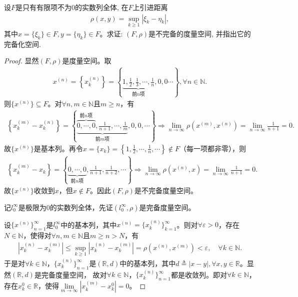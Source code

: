 \documentclass[../../main.tex]{subfiles}%
\begin{document}
\begin{example}
设$F$是只有有限项不为$0$的实数列全体, 在$F$上引进距离
\begin{align*}
\rho(x,y)=\sup\limits_{k\geqslant1}|\xi_k-\eta_k|,
\end{align*}
其中$x=\{\xi_k\}\in F, y=\{\eta_k\}\in F$。求证: $(F,\rho)$是不完备的度量空间, 并指出它的完备化空间.
\end{example}
\begin{proof}
显然$(F,\rho)$是度量空间。取
\begin{align*}
x^{(n)}=\left\{x_k^{(n)}\right\}=\left\{\underbrace{1,\frac{1}{2},\frac{1}{3},\cdots,\frac{1}{n}}_{\text{前}n\text{项}},0,0\cdots\right\},\forall n\in\mathbb{N}.
\end{align*}
则$\{x^{(n)}\}\subseteq F$。对$\forall n,m\in\mathbb{N}$且$m\geqslant n$，有
\begin{align*}
\left\{x_k^{(m)}-x_k^{(n)}\right\}=\left\{\underbrace{\overbrace{0,\cdots,0}^{\text{前}n\text{项}},\frac{1}{n+1},\cdots,\frac{1}{m}}_{\text{前}m\text{项}},0,0,\cdots\right\}\Longrightarrow\lim\limits_{n\rightarrow\infty}\rho(x^{(m)},x^{(n)})=\lim\limits_{n\rightarrow\infty}\frac{1}{n+1}=0.
\end{align*}
故$\{x^{(n)}\}$是基本列。再令$x=\{x_k\}=\left\{1,\frac{1}{2},\cdots,\frac{1}{n},\cdots\right\}\notin F$（每一项都非零），则
\begin{align*}
\left\{x_k^{(m)}-x_k\right\}=\left\{\underbrace{0,\cdots,0}_{\text{前}n\text{项}},\frac{1}{n+1},\frac{1}{n+2},\cdots\right\}\Longrightarrow\lim\limits_{n\rightarrow\infty}\rho(x^{(n)},x)=\lim\limits_{n\rightarrow\infty}\frac{1}{n+1}=0.
\end{align*}
故$\{x^{(n)}\}$收敛到$x$，但$x\notin F$。因此$(F,\rho)$是不完备度量空间。

记$l_0^\infty$是极限为$0$的实数列全体，先证$(l_0^\infty,\rho)$是完备度量空间。

设$\{x^{(n)}\}_{n=1}^{\infty}$是$l_0^\infty$中的基本列，其中$x^{(n)}=\{x_k^{(n)}\}_{k=1}^{\infty}$。则对$\forall \varepsilon>0$，存在$N\in\mathbb{N}$，使得对$\forall n,m\in\mathbb{N}$且$m\geqslant n>N$，有
\begin{align*}
\left|x_k^{(n)}-x_k^{(m)}\right|\leqslant\sup\limits_{k\geqslant 1}\left|x_k^{(n)}-x_k^{(m)}\right|=\rho(x^{(n)},x^{(m)})<\varepsilon,\quad \forall k\in\mathbb{N}.
\end{align*}
于是对$\forall k\in\mathbb{N}$，$\{x_k^{(n)}\}_{n=1}^{\infty}$是$(\mathbb{R},d)$中的基本列，其中$d\triangleq|x-y|,\forall x,y\in\mathbb{R}$。显然$(\mathbb{R},d)$是完备度量空间，
故对$\forall k\in\mathbb{N}$，$\{x_k^{(n)}\}_{n=1}^{\infty}$都是收敛列。即对$\forall k\in\mathbb{N}$，存在$x_k^0\in\mathbb{R}$，使得$\lim\limits_{m\rightarrow\infty}\left|x_k^{(m)}-x_k^0\right|=0$。


\end{proof}
\end{document}
